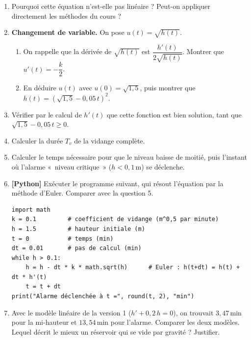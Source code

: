 \documentclass[a4paper,11pt]{article}
\newcommand{\rep}[1]{\par\noindent\begin{minipage}[t][#1cm]{\linewidth}\mbox{}\end{minipage}\par}
\newcommand{\py}{{\color{uimmred}\small\bfseries[Python]}}
\begin{document}
\begin{enumerate}
  \needspace{4.1cm}
  \item Pourquoi cette équation n'est-elle pas linéaire ? Peut-on appliquer directement les méthodes du cours ?
  \rep{2}
  \item \textbf{Changement de variable.} On pose $u(t) = \sqrt{h(t)}$.
  \begin{enumerate}
    \needspace{4.6cm}
    \item On rappelle que la dérivée de $\sqrt{h(t)}$ est $\dfrac{h'(t)}{2\sqrt{h(t)}}$. Montrer que $u'(t) = -\dfrac{k}{2}$.
    \rep{2.5}
    \needspace{5.1cm}
    \item En déduire $u(t)$ avec $u(0) = \sqrt{1{,}5}$, puis montrer que $h(t) = \left(\sqrt{1{,}5} - 0{,}05\,t\right)^2$.
    \rep{3}
  \end{enumerate}
  \needspace{4.6cm}
  \item Vérifier par le calcul de $h'(t)$ que cette fonction est bien solution, tant que $\sqrt{1{,}5} - 0{,}05\,t \geq 0$.
  \rep{2.5}
  \needspace{3.6cm}
  \item Calculer la durée $T_v$ de la vidange complète.
  \rep{2}
  \needspace{5.6cm}
  \item Calculer le temps nécessaire pour que le niveau baisse de moitié, puis l'instant où l'alarme «~niveau critique~» ($h < 0{,}1$\,m) se déclenche.
  \rep{3.5}
  \needspace{8.2cm}
  \item \py{} Exécuter le programme suivant, qui résout l'équation par la méthode d'Euler. Comparer avec la question 5.
\begin{lstlisting}[style=uimmpython]
import math
k = 0.1         # coefficient de vidange (m^0,5 par minute)
h = 1.5         # hauteur initiale (m)
t = 0           # temps (min)
dt = 0.01       # pas de calcul (min)
while h > 0.1:
    h = h - dt * k * math.sqrt(h)      # Euler : h(t+dt) = h(t) + dt * h'(t)
    t = t + dt
print("Alarme déclenchée à t =", round(t, 2), "min")
\end{lstlisting}
  \rep{1.5}
  \needspace{5.6cm}
  \item Avec le modèle linéaire de la version 1 ($h' + 0{,}2\,h = 0$), on trouvait $3{,}47$\,min pour la mi-hauteur et $13{,}54$\,min pour l'alarme. Comparer les deux modèles. Lequel décrit le mieux un réservoir qui se vide par gravité ? Justifier.
  \rep{3}
\end{enumerate}
\end{document}
